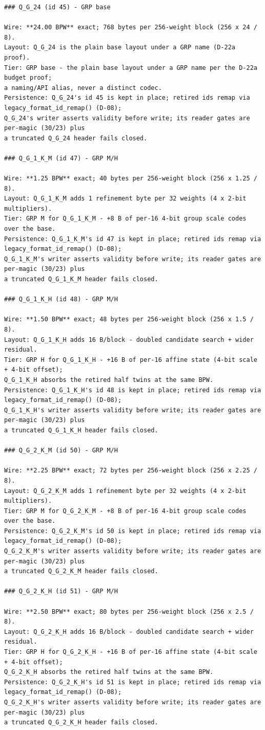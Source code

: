 \begin{Verbatim}[breaklines,breakanywhere,fontsize=\footnotesize]
### Q_G_24 (id 45) - GRP base

Wire: **24.00 BPW** exact; 768 bytes per 256-weight block (256 x 24 / 8).
Layout: Q_G_24 is the plain base layout under a GRP name (D-22a proof).
Tier: GRP base - the plain base layout under a GRP name per the D-22a budget proof;
a naming/API alias, never a distinct codec.
Persistence: Q_G_24's id 45 is kept in place; retired ids remap via legacy_format_id_remap() (D-08);
Q_G_24's writer asserts validity before write; its reader gates are per-magic (30/23) plus
a truncated Q_G_24 header fails closed.

### Q_G_1_K_M (id 47) - GRP M/H

Wire: **1.25 BPW** exact; 40 bytes per 256-weight block (256 x 1.25 / 8).
Layout: Q_G_1_K_M adds 1 refinement byte per 32 weights (4 x 2-bit multipliers).
Tier: GRP M for Q_G_1_K_M - +8 B of per-16 4-bit group scale codes over the base.
Persistence: Q_G_1_K_M's id 47 is kept in place; retired ids remap via legacy_format_id_remap() (D-08);
Q_G_1_K_M's writer asserts validity before write; its reader gates are per-magic (30/23) plus
a truncated Q_G_1_K_M header fails closed.

### Q_G_1_K_H (id 48) - GRP M/H

Wire: **1.50 BPW** exact; 48 bytes per 256-weight block (256 x 1.5 / 8).
Layout: Q_G_1_K_H adds 16 B/block - doubled candidate search + wider residual.
Tier: GRP H for Q_G_1_K_H - +16 B of per-16 affine state (4-bit scale + 4-bit offset);
Q_G_1_K_H absorbs the retired half twins at the same BPW.
Persistence: Q_G_1_K_H's id 48 is kept in place; retired ids remap via legacy_format_id_remap() (D-08);
Q_G_1_K_H's writer asserts validity before write; its reader gates are per-magic (30/23) plus
a truncated Q_G_1_K_H header fails closed.

### Q_G_2_K_M (id 50) - GRP M/H

Wire: **2.25 BPW** exact; 72 bytes per 256-weight block (256 x 2.25 / 8).
Layout: Q_G_2_K_M adds 1 refinement byte per 32 weights (4 x 2-bit multipliers).
Tier: GRP M for Q_G_2_K_M - +8 B of per-16 4-bit group scale codes over the base.
Persistence: Q_G_2_K_M's id 50 is kept in place; retired ids remap via legacy_format_id_remap() (D-08);
Q_G_2_K_M's writer asserts validity before write; its reader gates are per-magic (30/23) plus
a truncated Q_G_2_K_M header fails closed.

### Q_G_2_K_H (id 51) - GRP M/H

Wire: **2.50 BPW** exact; 80 bytes per 256-weight block (256 x 2.5 / 8).
Layout: Q_G_2_K_H adds 16 B/block - doubled candidate search + wider residual.
Tier: GRP H for Q_G_2_K_H - +16 B of per-16 affine state (4-bit scale + 4-bit offset);
Q_G_2_K_H absorbs the retired half twins at the same BPW.
Persistence: Q_G_2_K_H's id 51 is kept in place; retired ids remap via legacy_format_id_remap() (D-08);
Q_G_2_K_H's writer asserts validity before write; its reader gates are per-magic (30/23) plus
a truncated Q_G_2_K_H header fails closed.


\end{Verbatim}
